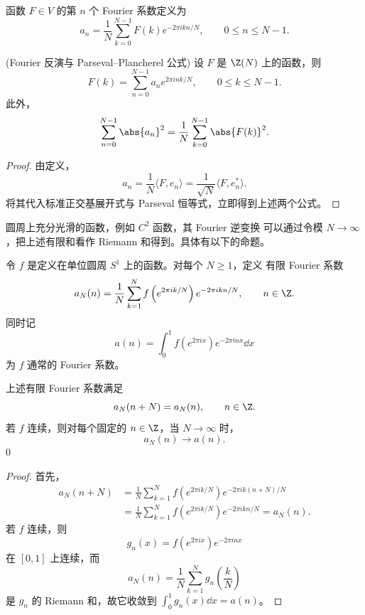 \begin{definition}\label{def:finite-fourier-coefficients}
	函数 $F\in V$ 的第 $n$ 个 Fourier 系数定义为
	\[
	a_n
	=\frac1N\sum_{k=0}^{N-1}
	F(k)e^{-2\pi ikn/N},
	\qquad 0\leq n\leq N-1.
	\]
\end{definition}

\begin{theorem}(Fourier 反演与 Parseval--Plancherel 公式)
	\label{thm:finite-fourier-inversion-parseval}
	设 $F$ 是 $\Z(N)$ 上的函数，则
	\[
	F(k)=\sum_{n=0}^{N-1}a_ne^{2\pi ink/N},
	\qquad 0\leq k\leq N-1.
	\]
	此外，
	\[
	\sum_{n=0}^{N-1}\abs{a_n}^2
	=\frac1N\sum_{k=0}^{N-1}\abs{F(k)}^2.
	\]
\end{theorem}

\begin{proof}
	由定义，
	\[
	a_n=\frac1N\langle F,e_n\rangle
	=\frac1{\sqrt N}\langle F,e_n^*\rangle.
	\]
	将其代入标准正交基展开式与 Parseval 恒等式，立即得到上述两个公式。
\end{proof}


	圆周上充分光滑的函数，例如 $C^2$ 函数，其 Fourier 逆变换
	可以通过令模 $N\to\infty$，把上述有限和看作 Riemann 和得到。具体有以下的命题。





令 $f$ 是定义在单位圆周 $S^1$ 上的函数。对每个 $N\geq1$，定义
有限 Fourier 系数
\[
a_N(n)=\frac1N\sum_{k=1}^N
f\left(e^{2\pi ik/N}\right)e^{-2\pi ikn/N},
\qquad n\in\Z.
\]
同时记
\[
a(n)=\int_0^1 f\left(e^{2\pi ix}\right)e^{-2\pi inx}\dd x
\]
为 $f$ 通常的 Fourier 系数。

\begin{proposition}\label{prop:finite-circle-fourier-limit}
	上述有限 Fourier 系数满足
	\[
	a_N(n+N)=a_N(n),
	\qquad n\in\Z.
	\]
	若 $f$ 连续，则对每个固定的 $n\in\Z$，当 $N\to\infty$ 时，
	\[
	a_N(n)\longrightarrow a(n).
	\]
0\end{proposition}

\begin{proof}
	首先，
	\[
	\begin{aligned}
	a_N(n+N)
	&=\frac1N\sum_{k=1}^N
	f\left(e^{2\pi ik/N}\right)e^{-2\pi ik(n+N)/N}\\
	&=\frac1N\sum_{k=1}^N
	f\left(e^{2\pi ik/N}\right)e^{-2\pi ikn/N}
	=a_N(n).
	\end{aligned}
	\]
	若 $f$ 连续，则
	\[
	g_n(x)=f\left(e^{2\pi ix}\right)e^{-2\pi inx}
	\]
	在 $[0,1]$ 上连续，而
	\[
	a_N(n)=\frac1N\sum_{k=1}^Ng_n\left(\frac{k}{N}\right)
	\]
	是 $g_n$ 的 Riemann 和，故它收敛到
	$\displaystyle\int_0^1g_n(x)\dd x=a(n)$。
\end{proof}

